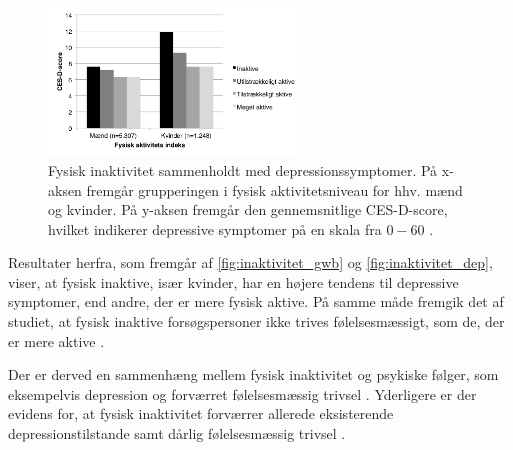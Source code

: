 \begin{figure}[H]
\centering
\includegraphics[width=0.6\textwidth]{figures/inaktivitet_dep}
\caption{Fysisk inaktivitet sammenholdt med depressionssymptomer. På x-aksen fremgår grupperingen i fysisk aktivitetsniveau for hhv. mænd og kvinder. På y-aksen fremgår den gennemsnitlige CES-D-score, hvilket indikerer depressive symptomer på en skala fra $0-60$ \citep{galper2006}.}
\label{fig:inaktivitet_dep}
\end{figure}

\noindent
Resultater herfra, som fremgår af \autoref{fig:inaktivitet_gwb} og \autoref{fig:inaktivitet_dep}, viser, at fysisk inaktive, især kvinder, har en højere tendens til depressive symptomer, end andre, der er mere fysisk aktive. På samme måde fremgik det af studiet, at fysisk inaktive forsøgspersoner  ikke trives følelsesmæssigt, som de, der er mere aktive \citep{galper2006}. 

Der er derved en sammenhæng mellem fysisk inaktivitet og psykiske følger, som eksempelvis depression og forværret følelsesmæssig trivsel \citep{galper2006}. Yderligere er der evidens for, at fysisk inaktivitet forværrer allerede eksisterende depressionstilstande samt dårlig følelsesmæssig trivsel \citep{motionsraad2007}.
